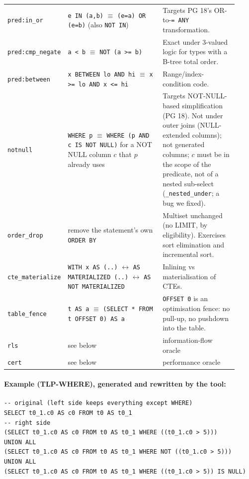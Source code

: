 \begin{longtable}{p{0.17\linewidth}p{0.42\linewidth}p{0.33\linewidth}}
\texttt{pred:in\_or} & \texttt{e IN (a,b)} $\equiv$ \texttt{(e=a) OR (e=b)} (also \texttt{NOT IN}) & Targets PG 18's OR-to-\texttt{= ANY} transformation. \\
\texttt{pred:cmp\_negate} & \texttt{a < b} $\equiv$ \texttt{NOT (a >= b)} & Exact under 3-valued logic for types with a B-tree total order. \\
\texttt{pred:between} & \texttt{x BETWEEN lo AND hi} $\equiv$ \texttt{x >= lo AND x <= hi} & Range/index-condition code. \\
\texttt{notnull} & \texttt{WHERE p} $\equiv$ \texttt{WHERE (p AND c IS NOT NULL)} for a NOT NULL column $c$ that $p$ already uses & Targets NOT-NULL-based simplification (PG 18). Not under outer joins (NULL-extended columns); not generated columns; $c$ must be in the scope of the predicate, not of a nested sub-select (\texttt{\_nested\_under}; a bug we fixed). \\
\texttt{order\_drop} & remove the statement's own \texttt{ORDER BY} & Multiset unchanged (no LIMIT, by eligibility). Exercises sort elimination and incremental sort. \\
\texttt{cte\_materialize} & \texttt{WITH x AS (..)} $\leftrightarrow$ \texttt{AS MATERIALIZED (..)} $\leftrightarrow$ \texttt{AS NOT MATERIALIZED} & Inlining vs materialisation of CTEs. \\
\texttt{table\_fence} & \texttt{t AS a} $\equiv$ \texttt{(SELECT * FROM t OFFSET 0) AS a} & \texttt{OFFSET 0} is an optimisation fence: no pull-up, no pushdown into the table. \\
\texttt{rls} & see below & information-flow oracle \\
\texttt{cert} & see below & performance oracle \\
\bottomrule
\end{longtable}

\paragraph{Example (TLP-WHERE), generated and rewritten by the tool:}
\begin{lstlisting}
-- original (left side keeps everything except WHERE)
SELECT t0_1.c0 AS c0 FROM t0 AS t0_1
-- right side
(SELECT t0_1.c0 AS c0 FROM t0 AS t0_1 WHERE ((t0_1.c0 > 5)))
UNION ALL
(SELECT t0_1.c0 AS c0 FROM t0 AS t0_1 WHERE NOT ((t0_1.c0 > 5)))
UNION ALL
(SELECT t0_1.c0 AS c0 FROM t0 AS t0_1 WHERE ((t0_1.c0 > 5)) IS NULL)
\end{lstlisting}


